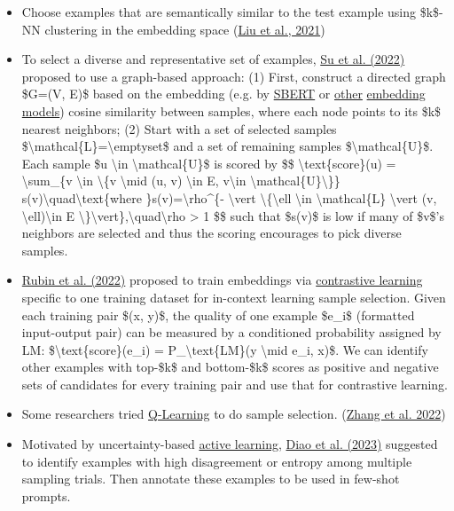 \begin{itemize}
\item
  Choose examples that are semantically similar to the test example using \$k\$-NN clustering in the embedding space (\href{https://arxiv.org/abs/2101.06804}{Liu et al., 2021})
\item
  To select a diverse and representative set of examples, \href{https://arxiv.org/abs/2209.01975}{Su et al. (2022)} proposed to use a graph-based approach: (1) First, construct a directed graph \$G=(V, E)\$ based on the embedding (e.g. by \href{https://arxiv.org/abs/1908.10084}{SBERT} or \href{https://arxiv.org/abs/2201.10005}{other} \href{https://platform.openai.com/docs/guides/embeddings}{embedding} \href{https://openai.com/blog/new-and-improved-embedding-model}{models}) cosine similarity between samples, where each node points to its \$k\$ nearest neighbors; (2) Start with a set of selected samples \$\textbackslash mathcal\{L\}=\textbackslash emptyset\$ and a set of remaining samples \$\textbackslash mathcal\{U\}\$. Each sample \$u \textbackslash in \textbackslash mathcal\{U\}\$ is scored by \$\$ \textbackslash text\{score\}(u) = \textbackslash sum\_\{v \textbackslash in \textbackslash\{v \textbackslash mid (u, v) \textbackslash in E, v\textbackslash in \textbackslash mathcal\{U\}\textbackslash\}\} s(v)\textbackslash quad\textbackslash text\{where \}s(v)=\textbackslash rho\^{}\{- \textbackslash vert \textbackslash\{\textbackslash ell \textbackslash in \textbackslash mathcal\{L\} \textbackslash vert (v, \textbackslash ell)\textbackslash in E \textbackslash\}\textbackslash vert\},\textbackslash quad\textbackslash rho \textgreater{} 1 \$\$ such that \$s(v)\$ is low if many of \$v\$'s neighbors are selected and thus the scoring encourages to pick diverse samples.
\item
  \href{https://arxiv.org/abs/2112.08633}{Rubin et al. (2022)} proposed to train embeddings via \href{https://lilianweng.github.io/posts/2021-05-31-contrastive/}{contrastive learning} specific to one training dataset for in-context learning sample selection. Given each training pair \$(x, y)\$, the quality of one example \$e\_i\$ (formatted input-output pair) can be measured by a conditioned probability assigned by LM: \$\textbackslash text\{score\}(e\_i) = P\_\textbackslash text\{LM\}(y \textbackslash mid e\_i, x)\$. We can identify other examples with top-\$k\$ and bottom-\$k\$ scores as positive and negative sets of candidates for every training pair and use that for contrastive learning.
\item
  Some researchers tried \href{https://lilianweng.github.io/posts/2018-02-19-rl-overview/\#q-learning-off-policy-td-control}{Q-Learning} to do sample selection. (\href{https://arxiv.org/abs/2211.04486}{Zhang et al. 2022})
\item
  Motivated by uncertainty-based \href{https://lilianweng.github.io/posts/2022-02-20-active-learning/}{active learning}, \href{https://arxiv.org/abs/2302.12246}{Diao et al. (2023)} suggested to identify examples with high disagreement or entropy among multiple sampling trials. Then annotate these examples to be used in few-shot prompts.
\end{itemize}

